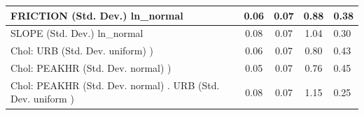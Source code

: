 \begin{table}
\begin{center}
\begin{tabular}{|l|l|c|c|c|l|}
			\hline
			FRICTION (Std. Dev.) ln_normal &  & 0.06 & 0.07 & 0.88 & 0.38 \\
			\hline
			SLOPE (Std. Dev.) ln_normal &  & 0.08 & 0.07 & 1.04 & 0.30 \\
			\hline
			 Chol: URB (Std. Dev. uniform) ) &  & 0.06 & 0.07 & 0.80 & 0.43 \\
			\hline
			 Chol: PEAKHR (Std. Dev. normal) ) &  & 0.05 & 0.07 & 0.76 & 0.45 \\
			\hline
			 Chol: PEAKHR (Std. Dev. normal) . URB (Std. Dev.   uniform ) &  & 0.08 & 0.07 & 1.15 & 0.25 \\
			\hline
		\end{tabular}
	\end{center}
\end{table}